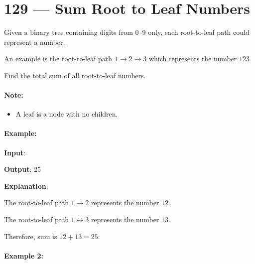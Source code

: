 \section{129 --- Sum Root to Leaf Numbers}
Given a binary tree containing digits from 0--9 only, each root-to-leaf path could represent a number.

An example is the root-to-leaf path $1\longrightarrow 2\longrightarrow 3$ which represents the number $123$.

Find the total sum of all root-to-leaf numbers.

\paragraph{Note:}
\begin{itemize}
    \item A leaf is a node with no children.
\end{itemize}


\paragraph{Example:}

\begin{flushleft}


\textbf{Input}: 
\begin{figure}[H]
\end{figure}


\textbf{Output}: 25

\textbf{Explanation}:

The root-to-leaf path $1\longrightarrow 2$ represents the number $12$.

The root-to-leaf path $1\longleftrightarrow 3$ represents the number $13$.

Therefore, sum is $12 + 13 = 25$.
\end{flushleft}


\paragraph{Example 2:}

